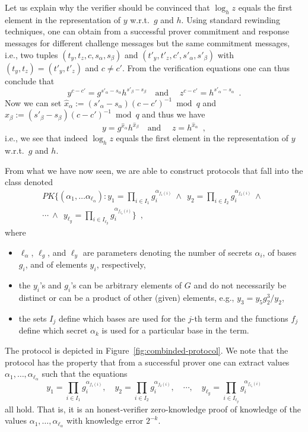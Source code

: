 Let us explain why the verifier should be convinced 
that $\log_h z$ equals the first element in the representation 
of $y$ w.r.t.\  $g$ and $h$.
Using standard rewinding techniques, one can obtain from 
a successful prover commitment and response messages 
for different challenge messages but the same commitment messages,
i.e., two tuples $(t_y,t_z,c,s_\alpha,s_\beta)$
and $(t'_y,t'_z,c',s'_\alpha,s'_\beta)$ with
$(t_y,t_z) = (t'_y,t'_z)$ and $c\neq c'$.
From the verification equations one can thus conclude that
\[
 y^{c-c'} =  g^{s'_\alpha-s_\alpha} h^{s'_\beta- s_\beta } 
\quad \text{and }\quad
 z^{c-c'} =  h^{s'_\alpha-s_\alpha}\enspace.
\]
Now we can set $\hat{x}_\alpha := (s'_\alpha-s_\alpha) (c-c')^{-1} \bmod{q}$
and $\hat{x}_\beta := (s'_\beta-s_\beta) (c-c')^{-1} \bmod{q}$
and thus we have
\[
 y =  g^{\hat{x}_\alpha} h^{\hat{x}_\beta } 
\quad \text{and }\quad
 z =  h^{\hat{x}_\alpha}\enspace,
\]
i.e., we see that indeed $\log_h z$ equals the first element in the representation 
of $y$ w.r.t.\  $g$ and $h$.

From what we have now seen, we are able to construct protocols
that fall into the class denoted
\begin{multline*}
\mathit{PK}\{(\alpha_1, \ldots \alpha_{\ell_\alpha}):
y_1 = \prod_{i \in I_1 } g_i^{\alpha_{f_1(i)}}
\ \wedge\ \
y_2 = \prod_{i \in I_2 } g_i^{\alpha_{f_2(i)}}
\ \wedge\ \ \\
\cdots
\ \wedge\ \
y_{\ell_y} = \prod_{i \in I_{\ell_y} } g_i^{\alpha_{f_{\ell_y}(i)}}
\}\enspace,
\end{multline*}
where 
\begin{itemize}
\item $\ell_\alpha$, $\ell_g$, and  $\ell_y$ are parameters denoting 
the number of secrets $\alpha_i$, of bases $g_i$, and of elements $y_i$, respectively,
\item the $y_i$'s and $g_i$'s can be arbitrary elements of $G$ and do not necessarily be
distinct or can be a product of other (given) elements, e.g., $y_3 = y_5 g_2^3 / y_2$, 
\item the sets $I_j$ define which bases are used for the $j$-th
term and the functions $f_j$ define which secret $\alpha_k$ is used
for a particular base in the term.
\end{itemize}
The protocol is depicted in Figure~\ref{fig:combinded-protocol}.
We note that the protocol has the property that from a successful prover
one can extract values $\alpha_1, \ldots, \alpha_{\ell_\alpha}$
such that the equations
\[
y_1 = \prod_{i \in I_1 } g_i^{\alpha_{f_1(i)}}, \quad
y_2 = \prod_{i \in I_2 } g_i^{\alpha_{f_2(i)}}, \quad
\cdots, \quad 
y_{\ell_y} = \prod_{i \in I_{\ell_y} } g_i^{\alpha_{f_{\ell_y}(i)}}
\]
all hold.
That is, it is an honest-verifier zero-knowledge proof of knowledge of the values $\alpha_1, \ldots, \alpha_{\ell_\alpha}$
with knowledge error $2^{-k}$.


